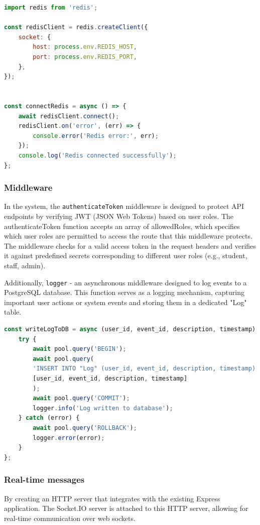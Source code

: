 \begin{lstlisting}[language=Javascript, breaklines=true, caption=Server connects to Redis]
import redis from 'redis';

const redisClient = redis.createClient({
	socket: {
		host: process.env.REDIS_HOST,
		port: process.env.REDIS_PORT,
	},
});


const connectRedis = async () => {
	await redisClient.connect();
	redisClient.on('error', (err) => {
		console.error('Redis error:', err);
	});
	console.log('Redis connected successfully');
};
\end{lstlisting}	


\subsubsection{Middleware}
In the system, the \texttt{authenticateToken} middleware is designed to protect API endpoints by verifying JWT (JSON Web Tokens) based on user roles. The authenticateToken function accepts an array of allowedRoles, which specifies which user roles are permitted to access the route that this middleware protects. The middleware checks for a valid access token in the request headers and verifies it against predefined secrets corresponding to different user roles (e.g., student, staff, admin).

Additionally, \texttt{logger} - an asynchronous middleware designed to log events to a PostgreSQL database. This function serves as a logging mechanism, capturing important user actions or system events and storing them in a dedicated "Log" table. 
\begin{lstlisting}[language=Javascript, breaklines=true, caption= Logger middleware - write log to database]
const writeLogToDB = async (user_id, event_id, description, timestamp) => {
	try {
		await pool.query('BEGIN');
		await pool.query(
		'INSERT INTO "Log" (user_id, event_id, description, timestamp) VALUES ($1, $2, $3, $4)',
		[user_id, event_id, description, timestamp]
		);
		await pool.query('COMMIT');
		logger.info('Log written to database');
	} catch (error) {
		await pool.query('ROLLBACK');
		logger.error(error);
	}
};
\end{lstlisting}	

\subsubsection{Real-time messages}
By creating an HTTP server that integrates with the existing Express application. The Socket.IO server is attached to this HTTP server, allowing for real-time communication over web sockets.

